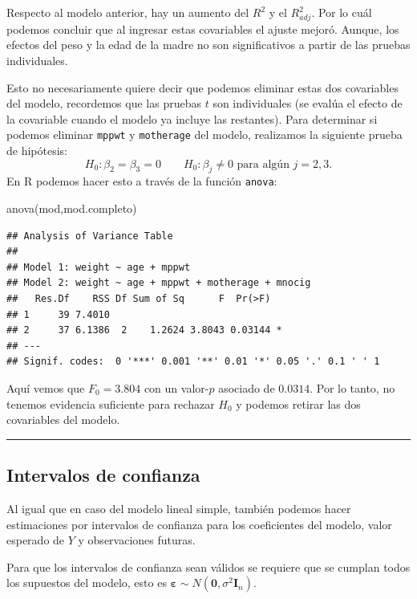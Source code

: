 \documentclass[
]{article}
\newenvironment{Shaded}{\begin{snugshade}}{\end{snugshade}}
\newcommand{\FunctionTok}[1]{\textcolor[rgb]{0.00,0.00,0.00}{#1}}
\newcommand{\NormalTok}[1]{#1}
\begin{document}
Respecto al modelo anterior, hay un aumento del \(R^{2}\) y el \(R^{2}_{adj}\). Por lo cuál podemos concluir que al ingresar estas covariables el ajuste mejoró. Aunque, los efectos del peso y la edad de la madre no son significativos a partir de las pruebas individuales.

Esto no necesariamente quiere decir que podemos eliminar estas dos covariables del modelo, recordemos que las pruebas \(t\) son individuales (se evalúa el efecto de la covariable cuando el modelo ya incluye las restantes). Para determinar si podemos eliminar \texttt{mppwt} y \texttt{motherage} del modelo, realizamos la siguiente prueba de hipótesis:
\[
H_{0}: \beta_{2} = \beta_{3} = 0 \qquad H_{0}: \beta_{j} \neq 0 \mbox{ para algún }j=2,3.
\]
En R podemos hacer esto a través de la función \texttt{anova}:

\begin{Shaded}
\begin{Highlighting}[]
\FunctionTok{anova}\NormalTok{(mod,mod.completo)}
\end{Highlighting}
\end{Shaded}

\begin{verbatim}
## Analysis of Variance Table
## 
## Model 1: weight ~ age + mppwt
## Model 2: weight ~ age + mppwt + motherage + mnocig
##   Res.Df    RSS Df Sum of Sq      F  Pr(>F)  
## 1     39 7.4010                              
## 2     37 6.1386  2    1.2624 3.8043 0.03144 *
## ---
## Signif. codes:  0 '***' 0.001 '**' 0.01 '*' 0.05 '.' 0.1 ' ' 1
\end{verbatim}

Aquí vemos que \(F_{0}= 3.804\) con un valor-\(p\) asociado de \(0.0314\). Por lo tanto, no tenemos evidencia suficiente para rechazar \(H_{0}\) y podemos retirar las dos covariables del modelo.

\rule{\textwidth}{0.4pt}

\hypertarget{intervalos-de-confianza-1}{%
\subsection{Intervalos de confianza}\label{intervalos-de-confianza-1}}

Al igual que en caso del modelo lineal simple, también podemos hacer estimaciones por intervalos de confianza para los coeficientes del modelo, valor esperado de \(Y\) y observaciones futuras.

Para que los intervalos de confianza sean válidos se requiere que se cumplan todos los supuestos del modelo, esto es \(\boldsymbol \varepsilon\sim N(\boldsymbol 0, \sigma^{2}\boldsymbol I_{n})\).
\end{document}

